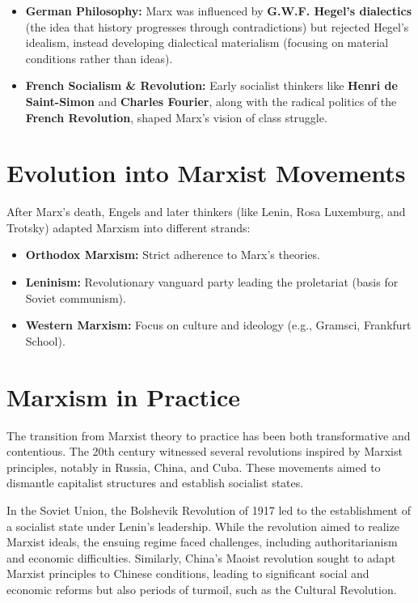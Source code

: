 \documentclass[14pt, russian]{matmex-diploma-custom}
\begin{document}
\begin{itemize}
    \item \textbf{German Philosophy:} Marx was influenced by \textbf{G.W.F. Hegel’s dialectics} (the idea that history progresses through contradictions) but rejected Hegel’s idealism, instead developing dialectical materialism (focusing on material conditions rather than ideas).
    \item \textbf{French Socialism & Revolution:} Early socialist thinkers like \textbf{Henri de Saint-Simon} and \textbf{Charles Fourier}, along with the radical politics of the \textbf{French Revolution}, shaped Marx’s vision of class struggle.
\end{itemize}

\section{Evolution into Marxist Movements}
After Marx’s death, Engels and later thinkers (like Lenin, Rosa Luxemburg, and Trotsky) adapted Marxism into different strands:

\begin{itemize}
    \item \textbf{Orthodox Marxism:} Strict adherence to Marx’s theories.
    \item \textbf{Leninism:} Revolutionary vanguard party leading the proletariat (basis for Soviet communism).
    \item \textbf{Western Marxism:} Focus on culture and ideology (e.g., Gramsci, Frankfurt School).
\end{itemize}

\section*{Marxism in Practice}
The transition from Marxist theory to practice has been both transformative and contentious. The 20th century witnessed several revolutions inspired by Marxist principles, notably in Russia, China, and Cuba. These movements aimed to dismantle capitalist structures and establish socialist states.

In the Soviet Union, the Bolshevik Revolution of 1917 led to the establishment of a socialist state under Lenin's leadership. While the revolution aimed to realize Marxist ideals, the ensuing regime faced challenges, including authoritarianism and economic difficulties. Similarly, China's Maoist revolution sought to adapt Marxist principles to Chinese conditions, leading to significant social and economic reforms but also periods of turmoil, such as the Cultural Revolution.
\end{document}
